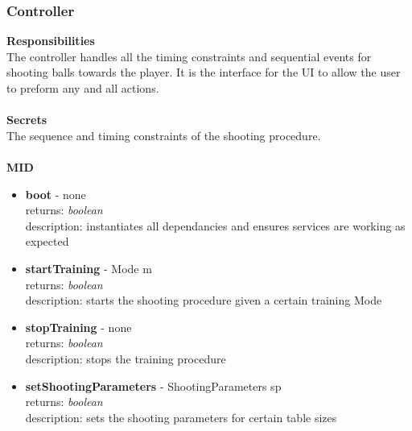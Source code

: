 \documentclass[11pt]{article}
\begin{document}
\subsubsection*{Controller}
\textbf{Responsibilities} \\
The controller handles all the timing constraints and sequential events for shooting balls towards the player. It is the interface for the UI to allow the user to preform any and all actions. \\ \\
\textbf{Secrets} \\
The sequence and timing constraints of the shooting procedure. \\ \\
\textbf{MID}
\begin{itemize}
\item \textbf{boot} - none \\ returns: \textit{boolean} \\ description: instantiates all dependancies and ensures services are working as expected
\item \textbf{startTraining} - Mode m \\ returns: \textit{boolean} \\ description: starts the shooting procedure given a certain training Mode
\item \textbf{stopTraining} - none \\ returns: \textit{boolean} \\ description: stops the training procedure
\item \textbf{setShootingParameters} - ShootingParameters sp \\ returns: \textit{boolean} \\ description: sets the shooting parameters for certain table sizes
\end{itemize}
\end{document}

